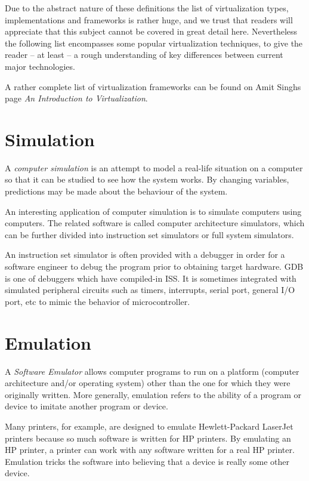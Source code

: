 Due to the abstract nature of these definitions the list of virtualization
types, implementations and frameworks is rather huge, and we trust that readers
will appreciate that this subject cannot be covered in great detail here.
Nevertheless the following list encompasses some popular virtualization
techniques, to give the reader -- at least -- a rough understanding of key
differences between current major technologies.

A rather complete list of virtualization frameworks can be found on Amit Singhs
page \textit{An Introduction to Virtualization}.~\cite{singh-intro}


\section{Simulation}

A \textit{computer simulation} is an attempt to model a real-life situation on
a computer so that it can be studied to see how the system works. By changing
variables, predictions may be made about the behaviour of the system.

An interesting application of computer simulation is to simulate computers
using computers. The related software is called computer architecture
simulators, which can be further divided into instruction set simulators or
full system simulators.

An instruction set simulator is often provided with a debugger in order for a
software engineer to debug the program prior to obtaining target hardware.  GDB
is one of debuggers which have compiled-in ISS. It is sometimes integrated with
simulated peripheral circuits such as timers, interrupts, serial port, general
I/O port, etc to mimic the behavior of microcontroller.~\cite{wp-iss}


\section{Emulation}

A \textit{Software Emulator} allows computer programs to run on a platform
(computer architecture and/or operating system) other than the one for which
they were originally written. More generally, emulation refers to the ability
of a program or device to imitate another program or device.

Many printers, for example, are designed to emulate Hewlett-Packard LaserJet
printers because so much software is written for HP printers. By emulating an
HP printer, a printer can work with any software written for a real HP printer.
Emulation tricks the software into believing that a device is really some other
device.

